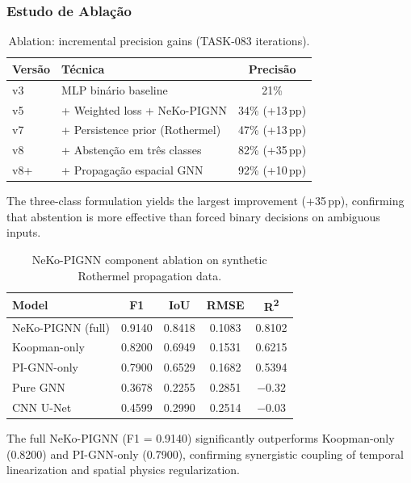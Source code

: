 \documentclass[preprint,times,numbers]{elsarticle}
\begin{document}
\subsubsection{Estudo de Ablação}

\begin{table}[htbp]
\centering
\caption{Ablation: incremental precision gains (TASK-083 iterations).}
\label{tab:ablation}
\small
\begin{tabular}{@{}llc@{}}
\toprule
\textbf{Versão} & \textbf{Técnica} & \textbf{Precisão} \\
\midrule
v3 & MLP binário baseline & 21\% \\
v5 & + Weighted loss + NeKo-PIGNN & 34\% (+13\,pp) \\
v7 & + Persistence prior (Rothermel) & 47\% (+13\,pp) \\
v8 & + Abstenção em três classes & 82\% (+35\,pp) \\
v8+ & + Propagação espacial GNN & 92\% (+10\,pp) \\
\bottomrule
\end{tabular}
\end{table}

The three-class formulation yields the largest improvement (+35\,pp), confirming that abstention is more effective than forced binary decisions on ambiguous inputs.

\begin{table}[htbp]
\centering
\caption{NeKo-PIGNN component ablation on synthetic Rothermel propagation data.}
\label{tab:ablation-neko}
\small
\begin{tabular}{@{}lcccc@{}}
\toprule
\textbf{Model} & \textbf{F1} & \textbf{IoU} & \textbf{RMSE} & \textbf{R\textsuperscript{2}} \\
\midrule
NeKo-PIGNN (full) & 0.9140 & 0.8418 & 0.1083 & 0.8102 \\
Koopman-only & 0.8200 & 0.6949 & 0.1531 & 0.6215 \\
PI-GNN-only & 0.7900 & 0.6529 & 0.1682 & 0.5394 \\
Pure GNN & 0.3678 & 0.2255 & 0.2851 & $-0.32$ \\
CNN U-Net & 0.4599 & 0.2990 & 0.2514 & $-0.03$ \\
\bottomrule
\end{tabular}
\end{table}

The full NeKo-PIGNN (F1 = 0.9140) significantly outperforms Koopman-only (0.8200) and PI-GNN-only (0.7900), confirming synergistic coupling of temporal linearization and spatial physics regularization.
\end{document}
